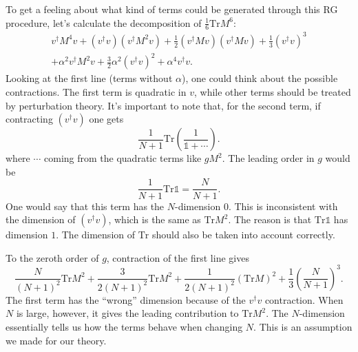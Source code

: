 
To get a feeling about what kind of terms could be generated through this RG procedure, let's calculate the decomposition of $\frac{1}{6}\mathrm{Tr} M^6$:
\begin{align*}
v^\dagger M^4 v + (v^\dagger v)(v^\dagger M^2 v) + \frac{1}{2} (v^\dagger M v) (v^\dagger M v) + \frac{1}{3}(v^\dagger v)^3 \\
+ \alpha^2 v^\dagger M^2 v + \frac{3}{2} \alpha^2 (v^\dagger v)^2 + \alpha^4 v^\dagger v.
\end{align*}
Looking at the first line (terms without $\alpha$), one could think about the possible contractions.
The first term is quadratic in $v$, while other terms should be treated by perturbation theory.
It's important to note that, for the second term, if contracting $(v^\dagger v)$ one gets
\[
	\frac{1}{N+1} \mathrm{Tr} \left( \frac{1}{\mathds{1}+\cdots} \right) 
.\] 
where $\cdots$ coming from the quadratic terms like $ g M^2$.
The leading order in $g$ would be
\[
	\frac{1}{N+1} \mathrm{Tr} \mathds{1} = \frac{N}{N+1}
.\] 
One would say that this term has the $N$-dimension $0$.
This is inconsistent with the dimension of $(v^\dagger v)$, which is the same as $\mathrm{Tr}M^2$.
The reason is that $\mathrm{Tr} \mathds{1}$ has dimension $1$.
The dimension of $\mathrm{Tr}$ should also be taken into account correctly.

To the zeroth order of $g$, contraction of the first line gives
\[
\frac{N}{(N+1)^2} \mathrm{Tr} M^2 + \frac{3}{2(N+1)^2} \mathrm{Tr} M^2 + \frac{1}{2(N+1)^2} \left(\mathrm{Tr}M\right)^2 + \frac{1}{3} \left( \frac{N}{N+1} \right)^3 
.\] 
The first term has the ``wrong'' dimension because of the $v^\dagger v$ contraction.
When $N$ is large, however, it gives the leading contribution to $\mathrm{Tr}M^2$.
The $N$-dimension essentially tells us how the terms behave when changing $N$.
This is an assumption we made for our theory.

